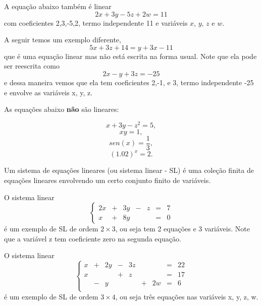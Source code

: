 \begin{ex}
A equação abaixo também é linear
\[
2x+3y-5z+2w=11
\]
com coeficientes 2,3,-5,2, termo independente 11 e variáveis $x$, $y$, $z$ e $w$.
\end{ex}

\begin{ex}
A seguir temos um exemplo diferente,
\[
5x+3z+14=y+3x-11
\] que é uma equação linear mas não está escrita na forma usual. Note que ela pode ser reescrita como
\[
2x-y+3z=-25
\]
e dessa maneira vemos que ela tem coeficientes 2,-1, e 3,  termo independente -25 e envolve as variáveis x, y, z.
\end{ex}

\begin{ex} As equações abaixo {\bf não} são lineares:

\[x+3y-z^2=5,\]
\[xy = 1,\]
\[sen(x)=\frac{1}{3}, \]
\[(1.02)^x=2.\]
\end{ex}

\begin{defn} Um sistema de equações lineares (ou sistema linear - SL) é uma coleção finita de equações lineares envolvendo um certo conjunto finito de  variáveis.
\end{defn}

\begin{ex}
O sistema linear
\begin{equation*}
\left\{
\begin{array}{ccccccc}
2x&+&3y&-&z&=&7 \\
x&+&8y& & &=&0
\end{array}
\right.
\end{equation*}
é um exemplo de SL de ordem $2 \times 3$, ou seja tem 2 equações e 3 variáveis. Note que a variável z tem coeficiente zero na segunda equação.
\end{ex}


\begin{ex}
O sistema linear
\begin{equation*}
\left\{
\begin{array}{ccccccccc}
x&+&2y&-&3z& & &=&22 \\
x& &  &+&z & & &=&17 \\
&-&y & &  &+&2w&=&6 \\
\end{array}
\right.
\end{equation*}
é um exemplo de SL de ordem $3 \times 4$, ou seja três equações nas variáveis x, y, z, w.
\end{ex}


